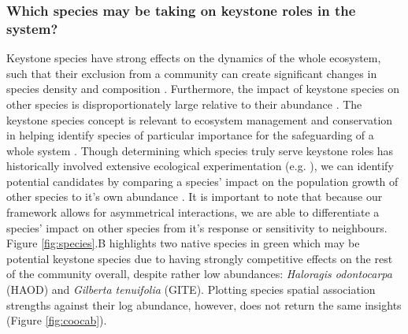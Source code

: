 \documentclass[a4,12pt]{article}
\begin{document}
    \subsubsection*{Which species may be taking on keystone roles in the system?}
    Keystone species have strong effects on the dynamics of the whole ecosystem, such that their exclusion from a community can create significant changes in species density and composition \parencite{Paine1969}. Furthermore, the impact of keystone species on other species is disproportionately large relative to their abundance \parencite{Power1996, Piraino2002, Libralato2006}. The keystone species concept is  relevant to ecosystem management and conservation in helping identify species of particular importance for the safeguarding of a whole system \parencite{Soule2005a}. Though determining which species truly serve keystone roles has historically involved extensive ecological experimentation (e.g. \cite{Paine1992}), we can identify potential candidates by comparing a species' impact on the population growth of other species to it's own abundance \parencite{Libralato2006}. It is important to note that because our framework allows for asymmetrical interactions, we are able to differentiate a species' impact on other species from it's response or sensitivity to neighbours. Figure \ref{fig:species}.B highlights two native species in green which may be potential keystone species due to having strongly competitive effects on the rest of the community overall, despite rather low abundances: \textit{Haloragis odontocarpa} (HAOD) and \textit{Gilberta tenuifolia} (GITE). Plotting species spatial association strengths against their log abundance, however, does not return the same insights (Figure \ref{fig:coocab}).
    
\end{document}
